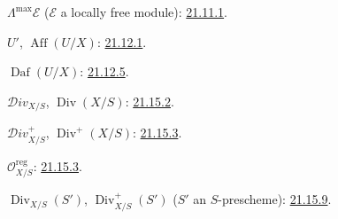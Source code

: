 $\Lambda^{\max}\mathcal E$ ($\mathcal E$ a locally free module):
{\hyperref[IV.21.11.1]{21.11.1}}.

$U'$, $\operatorname{Aff}(U/X)$: {\hyperref[IV.21.12.1]{21.12.1}}.

$\operatorname{Daf}(U/X)$: {\hyperref[IV.21.12.5]{21.12.5}}.

$\mathcal{D}iv_{X/S}$, $\operatorname{Div}(X/S)$:
{\hyperref[IV.21.15.2]{21.15.2}}.

$\mathcal{D}iv_{X/S}^+$, $\operatorname{Div}^+(X/S)$:
{\hyperref[IV.21.15.3]{21.15.3}}.

$\mathcal O_{X/S}^{\mathrm{reg}}$: {\hyperref[IV.21.15.3]{21.15.3}}.

$\operatorname{Div}_{X/S}(S')$, $\operatorname{Div}_{X/S}^+(S')$
($S'$ an $S$-prescheme): {\hyperref[IV.21.15.9]{21.15.9}}.

\endgroup
